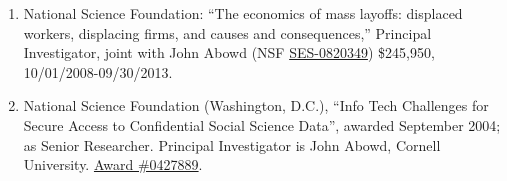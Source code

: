 \documentclass[10pt,letterpaper]{report}
\begin{document}
\begin{enumerate}
\item National Science Foundation: ``The economics of mass layoffs:
  displaced workers, displacing firms, and causes and consequences,''
  Principal Investigator, joint
  with John Abowd (NSF \href{http://www.nsf.gov/awardsearch/showAward.do?AwardNumber=082034}{SES-0820349}) \$245,950,  10/01/2008-09/30/2013.

\item National Science Foundation (Washington, D.C.),  ``Info
  Tech Challenges for Secure Access to Confidential Social Science Data'',
  awarded September 2004; as Senior Researcher. Principal Investigator is John Abowd, Cornell
  University.   \href{http://www.nsf.gov/awardsearch/showAward.do?AwardNumber=0427889}{Award \#0427889}.
\end{enumerate}
\end{document}
